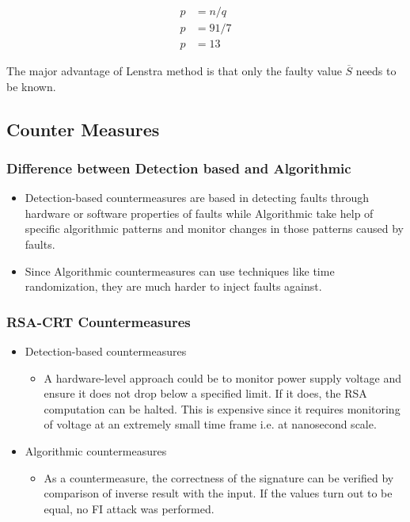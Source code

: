 \documentclass[1p,16pt]{elsarticle}
\begin{document}
\begin{align}
	p &= n / q \\
	p &= 91 / 7 \\
	p &= 13
\end{align}

The major advantage of Lenstra method is that only the faulty value $\overline{S}$ needs to be known.



\subsection{Counter Measures}%
\label{sub:counter_measures}

\subsubsection{Difference between Detection based and Algorithmic}%
\label{sub:difference_between_detection_based_and_algorithmic}
\begin{itemize}
	\item Detection-based countermeasures are based in detecting faults through hardware or software properties
		of faults while Algorithmic take help of specific algorithmic patterns and monitor changes in those
		patterns caused by faults.
	\item Since Algorithmic countermeasures can use techniques like time randomization, they are much harder
		to inject faults against.
\end{itemize}

\subsubsection{RSA-CRT Countermeasures}%
\label{sub:rsa_crt_countermeasures}
\begin{itemize}
	\item Detection-based countermeasures
		\begin{itemize}
			\item A hardware-level approach could be to monitor power supply voltage and ensure it does not drop below a specified limit. If it does, the RSA computation can be halted. This is expensive since it requires monitoring of voltage at an extremely small time frame i.e. at nanosecond scale.
		\end{itemize}
	\item Algorithmic countermeasures
		\begin{itemize}
			\item As a countermeasure, the correctness of the signature can be verified by comparison of inverse result with the input. If the values turn out to be equal, no FI attack was performed.
		\end{itemize}
\end{itemize}
\end{document}
